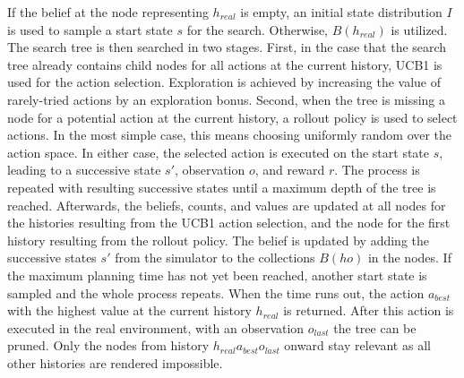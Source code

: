 If the belief at the node representing $h_{real}$ is empty, an initial state distribution $I$ is used to sample a start state $s$ for the search. Otherwise, $B(h_{real})$ is utilized. The search tree is then searched in two stages. First, in the case that the search tree already contains child nodes for all actions at the current history, UCB1 is used for the action selection. Exploration is achieved by increasing the value of rarely-tried actions by an exploration bonus. Second, when the tree is missing a node for a potential action at the current history, a rollout policy is used to select actions. In the most simple case, this means choosing uniformly random over the action space. In either case, the selected action is executed on the start state $s$, leading to a successive state $s'$, observation $o$, and reward $r$. The process is repeated with resulting successive states until a maximum depth of the tree is reached. Afterwards, the beliefs, counts, and values are updated at all nodes for the histories resulting from the UCB1 action selection, and the node for the first history resulting from the rollout policy. The belief is updated by adding the successive states $s'$ from the simulator to the collections $B(ho)$ in the nodes. If the maximum planning time has not yet been reached, another start state is sampled and the whole process repeats. When the time runs out, the action $a_{best}$ with the highest value at the current history $h_{real}$ is returned. After this action is executed in the real environment, with an observation $o_{last}$ the tree can be pruned. Only the nodes from history $h_{real}a_{best}o_{last}$ onward stay relevant as all other histories are rendered impossible.
